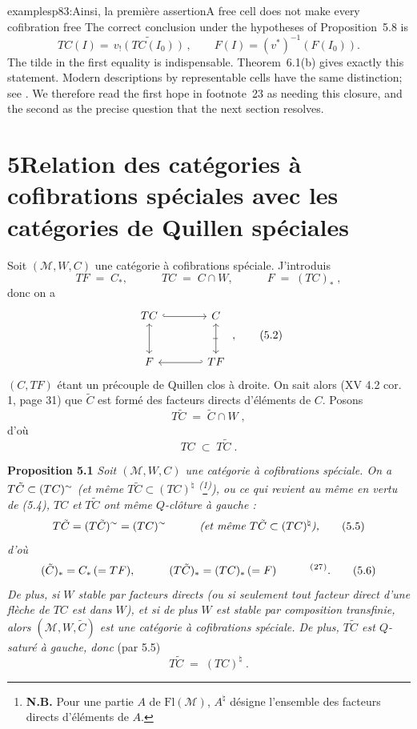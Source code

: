 \begin{dcomment}{examples}{p83:Ainsi, la première assertion}{A free cell does not make every cofibration free}
The correct conclusion under the hypotheses of Proposition~5.8 is
\[
 TC(I)=\widetilde{\,v_!(TC(I_0))\,},
 \qquad F(I)=(v^*)^{-1}(F(I_0)).
\]
The tilde in the first equality is indispensable. Theorem~6.1(b) gives exactly this statement. Modern descriptions by representable cells have the same distinction; see \citet[Theorem~12.3.2]{Riehl2014}. We therefore read the first hope in footnote~23 as needing this closure, and the second as the precise question that the next section resolves.
\end{dcomment}



\section*{5\quad Relation des catégories à cofibrations spéciales avec les catégories de Quillen spéciales}

Soit $(\mathcal{M}, W, C)$ une catégorie à cofibrations spéciale. J'introduis
\[
TF \;=\; C_{*}, \qquad\quad TC \;=\; C \cap W, \qquad\quad F \;=\; (TC)_{*} \; ,
\tag*{(5.1)}
\]
donc on a
\[
\begin{tikzcd}[row sep=large, column sep=large]
TC \arrow[r, hook] \arrow[d, leftrightarrow] & C \arrow[d, leftrightarrow, "\shortmid"{marking, sloped}] \\
F & TF \arrow[l, hook']
\end{tikzcd} \; ,
\tag*{(5.2)}
\]
$(C, TF)$ étant un précouple de Quillen clos à droite. On sait alors (XV 4.2 cor. 1, page 31) que $\tilde{C}$ est formé des facteurs directs d'éléments de $C$. Posons
\[
T\tilde{C} \;=\; \tilde{C} \cap W \; ,
\tag*{(5.3)}
\]
d'où
\[
TC \;\subset\; T\tilde{C} \; .
\tag*{(5.4)}
\]

\textbf{Proposition 5.1} \textit{Soit $(\mathcal{M}, W, C)$ une catégorie à cofibrations spéciale. On a $T\tilde{C} \subset (TC)^{\sim}$ (et même $T\tilde{C} \subset (TC)^{\natural}$ \textsuperscript{(}\footnote[26]{\textbf{N.B.} Pour une partie $A$ de $\mathrm{Fl}(\mathcal{M})$, $A^{\natural}$ désigne l'ensemble des facteurs directs d'éléments de $A$.}\textsuperscript{)}), ou ce qui revient au même en vertu de (5.4), $TC$ et $T\tilde{C}$ ont même $Q$-clôture à gauche :}
\[
T\tilde{C} = (T\tilde{C})^{\sim} = (TC)^{\sim} \qquad\quad \textit{(et même } T\tilde{C} \subset (TC)^{\natural}\textit{),}
\tag*{(5.5)}
\]
\textit{d'où}
\[
(\tilde{C})_{*} = C_{*} \, (= TF), \qquad\quad (T\tilde{C})_{*} = (TC)_{*} \, (= F) \qquad\quad \text{\fnm{27}}.
\tag*{(5.6)}
\]
\textit{De plus, si $W$ stable par facteurs directs (ou si seulement tout facteur direct d'une flèche de $TC$ est dans $W$), et si de plus $W$ est stable par composition transfinie, alors $(\mathcal{M}, W, \tilde{C})$ est une catégorie à cofibrations spéciale. De plus, $T\tilde{C}$ est $Q$-saturé à gauche, donc} (par 5.5)
\[
T\tilde{C} \;=\; (TC)^{\natural} \; .
\tag*{(5.7)}
\]

